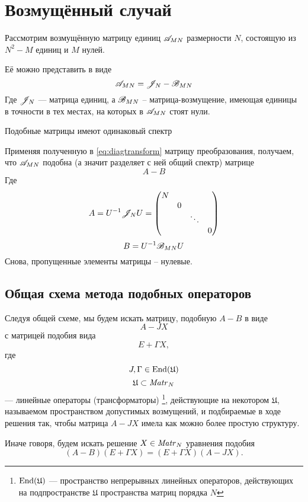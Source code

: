\section{Возмущённый случай}

Рассмотрим возмущённую матрицу единиц
\( \mathscr{A}_{{M}{N}} \) размерности \( N \),
состоящую из \( N^2 - M \) единиц и \( M \) нулей.

Её можно представить в виде
\[
    \mathscr{A}_{{M}{N}} = \mathscr{J}_{N} - \mathscr{B}_{{M}{N}}
    \]
Где \( \mathscr{J}_{N} \) --- матрица единиц,
а \( \mathscr{B}_{{M}{N}} \) -- матрица-возмущение,
имеющая единицы в точности в тех местах,
на которых в \( \mathscr{A}_{{M}{N}} \) стоят нули.

\begin{prop}
    Подобные матрицы имеют одинаковый спектр
\end{prop}

Применяя полученную в \eqref{eq:diagtransform} матрицу преобразования,
получаем, что \( \mathscr{A}_{{M}{N}} \) подобна (а значит разделяет с ней общий спектр)
матрице
\[ A - B \]
Где
\[
    A = {U}^{-1}{\mathscr{J}_{N}}{U}
    = \begin{pmatrix}
      N &   &        & \\
        & 0 &        & \\
        &   & \ddots & \\
        &   &        & 0
        \end{pmatrix}
        \]
\[
    B = {U}^{-1}{\mathscr{B}_{{M}{N}}}{U}
    \]
Снова, пропущенные элементы матрицы -- нулевые.

\subsection{Общая схема метода подобных операторов}
Следуя общей схеме, мы будем искать матрицу, подобную \( A - B \)
в виде
\[ A - J X \]
с матрицей подобия вида
\[ E + \Gamma X ,\]
где
\[ J, \Gamma \in \mathrm{End}({\mathfrak U}) \]
\[ \mathfrak{U}\subset\mathit{Matr}_{N} {} \]
--- линейные операторы (трансформаторы)
\footnote{\( \mathrm{End}({\mathfrak U}) \) --- пространство непрерывных линейных операторов,
действующих на подпространстве \( \mathfrak U \) пространства матриц порядка \( N \)},
действующие на некотором \( \mathfrak U \),
называемом пространством допустимых возмущений,
и подбираемые в ходе решения так, чтобы матрица \( A - JX \)
имела как можно более простую структуру.

Иначе говоря, будем искать решение \( X \in\mathit{Matr}_{N} {} \)
уравнения подобия
\begin{equation}\label{eq:similarity-orig}
    (A - B)(E+\Gamma X) = (E+\Gamma X) (A - JX).
\end{equation}

